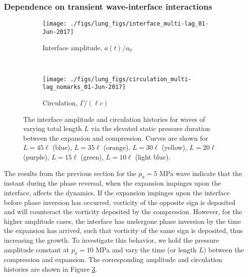 \documentclass{jfm}%
\begin{document}
\subsubsection{Dependence on transient wave-interface interactions}%
\label{subsubsec:transient}
\begin{figure}
  \centering
  \begin{subfigure}{0.48\textwidth}
    \centering
    \texttt{[image: ./figs/lung\_figs/interface\_multi-lag\_01-Jun-2017]}
    \caption{\label{fig:trapz_interface_multi-lag} Interface amplitude, $a(t)/a_0$}
  \end{subfigure}
  ~
  \begin{subfigure}{0.48\textwidth}
    \centering
    \texttt{[image: ./figs/lung\_figs/circulation\_multi-lag\_nomarks\_01-Jun-2017]}
    \caption{\label{fig:trapz_circ_multi-lag} Circulation, $\Gamma/(\ell c)$}%
  \end{subfigure}
  \caption[The interface and circulation dependence on wave
  duration]{The interface amplitude
     and circulation
     histories for waves of varying
    total length $L$ via the elevated static pressure duration between
    the expansion and compression. Curves are shown for $L=45\ell$
    (blue), $L=35\ell$ (orange), $L=30\ell$ (yellow), $L=20\ell$
    (purple), $L=15\ell$ (green), $L=10\ell$ (light blue).}
  \label{fig:trapz_circ_interface_multi-lag}
\end{figure}
The results from the previous section for the $p_a = 5$ MPa wave indicate
that the instant during the phase reversal, when the expansion
impinges upon the interface, affects the dynamics. If the expansion
impinges upon the interface before phase inversion has occurred,
vorticity of the opposite sign is deposited and will counteract the
vorticity deposited by the compression. However, for the higher
amplitude cases, the interface has undergone phase inversion by the
time the expansion has arrived, such that vorticity of the same sign
is deposited, thus increasing the growth. To investigate this
behavior, we hold the pressure amplitude constant at $p_a = 10$ MPa and vary
the time (or length $L$) between the compression and expansion. The
corresponding amplitude and circulation histories are shown in Figure
\ref{fig:trapz_circ_interface_multi-lag}.
\end{document}
